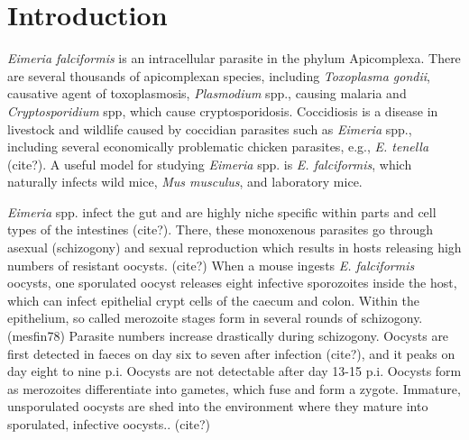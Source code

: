 \documentclass{bmcart}
\begin{document}



\section*{Introduction}
\textit{Eimeria falciformis} is an intracellular parasite in the phylum Apicomplexa. There are several thousands of apicomplexan species, including \textit{Toxoplasma gondii}, causative agent of toxoplasmosis, \textit{Plasmodium} spp., causing malaria and \textit{Cryptosporidium} spp, which cause cryptosporidosis. Coccidiosis is a disease in livestock and wildlife caused by coccidian parasites such as \textit{Eimeria} spp., including several economically problematic chicken parasites, e.g., \textit{E. tenella} (cite?). A useful model for studying \textit{Eimeria} spp. is \textit{E. falciformis}, which naturally infects wild mice, \textit{Mus musculus}, and laboratory mice. 

\textit{Eimeria} spp. infect the gut and are highly niche specific within parts and cell types of the intestines (cite?). There, these monoxenous parasites go through asexual (schizogony) and sexual reproduction which results in hosts releasing high numbers of resistant oocysts. (cite?) When a mouse ingests \textit{E. falciformis} oocysts, one sporulated oocyst releases eight infective sporozoites inside the host, which can infect epithelial crypt cells of the caecum and colon. Within the epithelium, so called merozoite stages form in several rounds of schizogony. (mesfin78) Parasite numbers increase drastically during schizogony. Oocysts are first detected in faeces on day six to seven after infection (cite?), and it peaks on day eight to nine p.i. Oocysts are not detectable after day 13-15 p.i. Oocysts form as merozoites differentiate into gametes, which fuse and form a zygote. Immature, unsporulated oocysts are shed into the environment where they mature into sporulated, infective oocysts.. (cite?)
\end{document}
